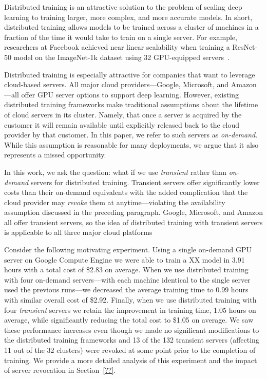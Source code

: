 Distributed training is an attractive solution to the problem of scaling deep
learning to training larger, more complex, and more accurate models. In short,
distributed training allows models to be trained across a cluster of machines
in a fraction of the time it would take to train on a single server. For
example, researchers at Facebook achieved near linear scalability when training
a ResNet-50 model on the ImageNet-1k dataset using 32 GPU-equipped
servers~\cite{}.

Distributed training is especially attractive for companies that want to
leverage cloud-based servers.  All major cloud providers---Google, Microsoft,
and Amazon---all offer GPU server options to support deep learning.  However,
existing distributed training frameworks make traditional assumptions about the
lifetime of cloud servers in its cluster. Namely, that once a server is
acquired by the customer it will remain available until explicitly released
back to the cloud provider by that customer. In this paper, we refer to such
servers as \emph{on-demand}. While this assumption is reasonable for many
deployments, we argue that it also represents a missed opportunity.   

In this work, we ask the question: what if we use \emph{transient} rather than
\emph{on-demand} servers for distributed training.  Transient servers offer
significantly lower costs than their on-demand equivalents with the added
complication that the cloud provider may \emph{revoke} them at anytime---violating the
availability assumption discussed in the preceding paragraph.  Google,
Microsoft, and Amazon all offer transient servers, so the idea of 
distributed training with transient servers is applicable to all three major
cloud platforms

Consider the following motivating experiment. Using a single on-demand GPU
server on Google Compute Engine we were able to train a XX model in 3.91 hours
with a total cost of \$2.83 on average. When we use distributed training with
four on-demand servers---with each machine identical to the single server used 
the previous runs---we decreased the average training time to 0.99 hours
with similar overall cost of \$2.92. Finally, when we use distributed training
with four \emph{transient} servers we retain the improvement in training time,
1.05 hours on average, while significantly reducing the total cost to \$1.05 on
average. We saw these performance increases even though we made no significant
modifications to the distributed training frameworks and 13 of the 132 transient
servers (affecting 11 out of the 32 clusters) were revoked at some point prior
to the completion of training. We provide a more detailed analysis of this
experiment and the impact of server revocation in Section~\ref{??}.      


